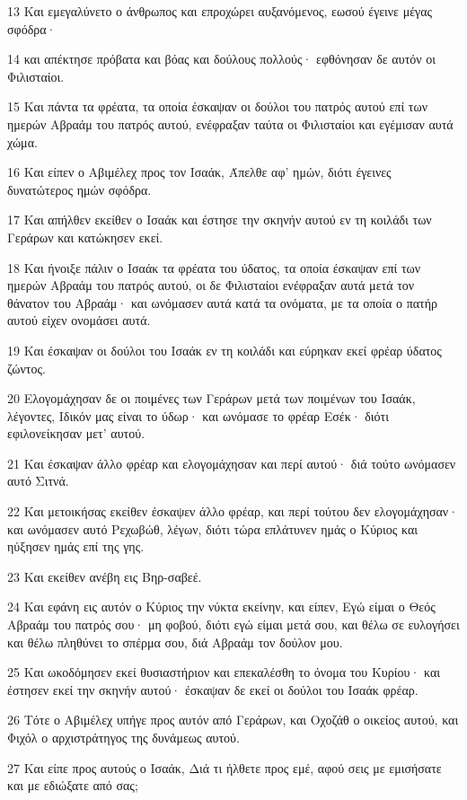 \par 13 Και εμεγαλύνετο ο άνθρωπος και επροχώρει αυξανόμενος, εωσού έγεινε μέγας σφόδρα·
\par 14 και απέκτησε πρόβατα και βόας και δούλους πολλούς· εφθόνησαν δε αυτόν οι Φιλισταίοι.
\par 15 Και πάντα τα φρέατα, τα οποία έσκαψαν οι δούλοι του πατρός αυτού επί των ημερών Αβραάμ του πατρός αυτού, ενέφραξαν ταύτα οι Φιλισταίοι και εγέμισαν αυτά χώμα.
\par 16 Και είπεν ο Αβιμέλεχ προς τον Ισαάκ, Άπελθε αφ' ημών, διότι έγεινες δυνατώτερος ημών σφόδρα.
\par 17 Και απήλθεν εκείθεν ο Ισαάκ και έστησε την σκηνήν αυτού εν τη κοιλάδι των Γεράρων και κατώκησεν εκεί.
\par 18 Και ήνοιξε πάλιν ο Ισαάκ τα φρέατα του ύδατος, τα οποία έσκαψαν επί των ημερών Αβραάμ του πατρός αυτού, οι δε Φιλισταίοι ενέφραξαν αυτά μετά τον θάνατον του Αβραάμ· και ωνόμασεν αυτά κατά τα ονόματα, με τα οποία ο πατήρ αυτού είχεν ονομάσει αυτά.
\par 19 Και έσκαψαν οι δούλοι του Ισαάκ εν τη κοιλάδι και εύρηκαν εκεί φρέαρ ύδατος ζώντος.
\par 20 Ελογομάχησαν δε οι ποιμένες των Γεράρων μετά των ποιμένων του Ισαάκ, λέγοντες, Ιδικόν μας είναι το ύδωρ· και ωνόμασε το φρέαρ Εσέκ· διότι εφιλονείκησαν μετ' αυτού.
\par 21 Και έσκαψαν άλλο φρέαρ και ελογομάχησαν και περί αυτού· διά τούτο ωνόμασεν αυτό Σιτνά.
\par 22 Και μετοικήσας εκείθεν έσκαψεν άλλο φρέαρ, και περί τούτου δεν ελογομάχησαν· και ωνόμασεν αυτό Ρεχωβώθ, λέγων, διότι τώρα επλάτυνεν ημάς ο Κύριος και ηύξησεν ημάς επί της γης.
\par 23 Και εκείθεν ανέβη εις Βηρ-σαβεέ.
\par 24 Και εφάνη εις αυτόν ο Κύριος την νύκτα εκείνην, και είπεν, Εγώ είμαι ο Θεός Αβραάμ του πατρός σου· μη φοβού, διότι εγώ είμαι μετά σου, και θέλω σε ευλογήσει και θέλω πληθύνει το σπέρμα σου, διά Αβραάμ τον δούλον μου.
\par 25 Και ωκοδόμησεν εκεί θυσιαστήριον και επεκαλέσθη το όνομα του Κυρίου· και έστησεν εκεί την σκηνήν αυτού· έσκαψαν δε εκεί οι δούλοι του Ισαάκ φρέαρ.
\par 26 Τότε ο Αβιμέλεχ υπήγε προς αυτόν από Γεράρων, και Οχοζάθ ο οικείος αυτού, και Φιχόλ ο αρχιστράτηγος της δυνάμεως αυτού.
\par 27 Και είπε προς αυτούς ο Ισαάκ, Διά τι ήλθετε προς εμέ, αφού σεις με εμισήσατε και με εδιώξατε από σας;
